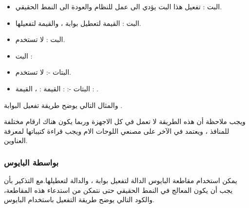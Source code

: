 \documentclass[document.tex]{subfiles}
\begin{document}
\begin{itemize}
\item البت : تفعيل هذا البت يؤدي الى عمل  للنظام والعودة الى النمط الحقيقي.
\item البت : القيمة  لتعطيل بوابة  ، والقيمة  لتفعيلها.
\item البت : لا تستخدم.
\item البت : 
\item البتات -: لا تستخدم.
\item البتات -:  : القيمة : ، القيمة : .
\end{itemize} 

والمثال التالي يوضح طريقة تفعيل البوابة .


\begin{english}
\lstset{numberstyle=\tiny,numbers=left,stepnumber=1,numbersep=5pt,tabsize=2,extendedchars=true,breaklines=true,frame=b,showspaces=false, showtabs=false,xleftmargin=10pt,framexleftmargin=10pt,framexrightmargin=5pt,framexbottommargin=4pt,showstringspaces=false,language=[x86masm]Assembler}


\end{english}

ويجب ملاحظة أن هذه الطريقة لا تعمل في كل الاجهزة وربما يكون هناك ارقام مختلفة للمنافذ ، ويعتمد في الآخر على مصنعي اللوحات الام ويجب قراءة كتيباتها لمعرفة العناوين.

\subsubsection{بواسطة البايوس}
يمكن استخدام مقاطعة البايوس  الدالة  لتفعيل بوابة  ، والدالة  لتعطيلها.مع التذكير بأن يجب أن يكون المعالج في النمط الحقيقي حتى نتمكن من استدعاء هذه المقاطعة، والكود التالي يوضح طريقة التفعيل باستخدام البايوس.

\begin{english}
\lstset{numberstyle=\tiny,numbers=left,stepnumber=1,numbersep=5pt,tabsize=2,extendedchars=true,breaklines=true,frame=b,showspaces=false, showtabs=false,xleftmargin=10pt,framexleftmargin=10pt,framexrightmargin=5pt,framexbottommargin=4pt,showstringspaces=false,language=[x86masm]Assembler}


\end{english}
\end{document}
